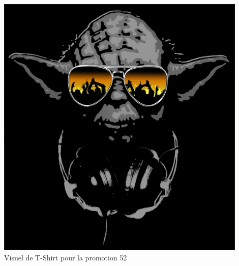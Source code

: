         \begin{center}
            \centering
            \includegraphics[width=0.9\textwidth]{img/yoda-or.jpg}\\
            Visuel de T-Shirt pour la promotion 52
        \end{center}




